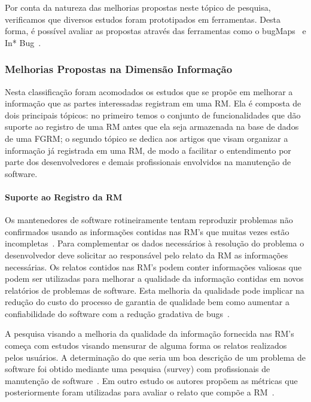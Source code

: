Por conta da natureza das melhorias propostas neste tópico de pesquisa,
verificamos que diversos estudos foram prototipados em ferramentas. Desta forma,
é possível avaliar as propostas através das ferramentas como o
bugMaps~\cite{hora2012bug} e In* Bug~\cite{dal2014bug}.

\subsubsection{Melhorias Propostas na Dimensão Informação}
\label{ssub:melhorias_dim_informacao}

Nesta classificação foram acomodados os estudos que se propõe em melhorar a
informação que as partes interessadas registram em uma RM\@. Ela é composta de
dois principais tópicos: no primeiro temos o conjunto de funcionalidades que dão
suporte ao registro de uma RM antes que ela seja armazenada na base de dados de
uma FGRM\@; o segundo tópico se dedica aos artigos que visam organizar a
informação já registrada em uma RM, de modo a facilitar o entendimento por parte
dos desenvolvedores e demais profissionais envolvidos na manutenção de software.

\paragraph{Suporte ao Registro da RM}

Os mantenedores de software rotineiramente tentam reproduzir problemas não
confirmados usando as informações contidas nas RM's que muitas vezes estão
incompletas~\cite{White:2015:GRR:2820282.2820291}. Para complementar os dados
necessários à resolução do problema o desenvolvedor deve solicitar ao
responsável pelo relato da RM as informações necessárias. Os relatos contidos
nas RM's podem conter informações valiosas que podem ser utilizadas para
melhorar a qualidade da informação contidas em novos relatórios de problemas de
software. Esta melhoria da qualidade pode implicar na redução do custo do
processo de garantia de qualidade bem como aumentar a confiabilidade do software
com a redução gradativa de bugs~\cite{Tu:2014:MQI:2677832.2677844}.

A pesquisa visando a melhoria da qualidade da informação fornecida nas RM's
começa com estudos visando mensurar de alguma forma os relatos realizados pelos
usuários. A determinação do que seria um boa descrição de um problema de
software foi obtido mediante uma pesquisa (survey) com profissionais de
manutenção de software~\cite{Bettenburg2008a}. Em outro estudo os autores
propõem as métricas que posteriormente foram utilizadas para avaliar o relato
que compõe a RM~\cite{Tu:2014:MQI:2677832.2677844}.

